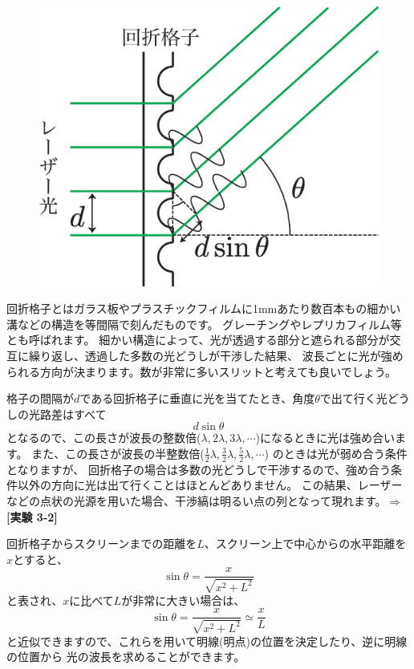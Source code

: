 \begin{figure}
\vspace*{-0.5cm}
\includegraphics[scale=0.5]{03_Interference/grating.eps}
\end{figure}


回折格子とはガラス板やプラスチックフィルムに1mmあたり数百本もの細かい溝などの構造を等間隔で刻んだものです。
グレーチングやレプリカフィルム等とも呼ばれます。
細かい構造によって、光が透過する部分と遮られる部分が交互に繰り返し、透過した多数の光どうしが干渉した結果、
波長ごとに光が強められる方向が決まります。数が非常に多いスリットと考えても良いでしょう。

格子の間隔が$d$である回折格子に垂直に光を当てたとき、角度$\theta$で出て行く光どうしの光路差はすべて
\[
d\sin\theta
\]
となるので、この長さが波長の整数倍($\lambda,2\lambda,3\lambda,\cdots$)になるときに光は強め合います。
また、この長さが波長の半整数倍($\frac{1}{2}\lambda,\frac{3}{2}\lambda,\frac{5}{2}\lambda,\cdots$)
のときは光が弱め合う条件となりますが、
回折格子の場合は多数の光どうしで干渉するので、強め合う条件以外の方向に光は出て行くことはほとんどありません。
この結果、レーザーなどの点状の光源を用いた場合、干渉縞は明るい点の列となって現れます。$\Rightarrow${\bf [実験 3-2]}

回折格子からスクリーンまでの距離を$L$、スクリーン上で中心からの水平距離を$x$とすると、
\[
\sin \theta = \frac{x}{\sqrt{x^2+L^2}}
\]
と表され、$x$に比べて$L$が非常に大きい場合は、
\[
\sin \theta = \frac{x}{\sqrt{x^2+L^2}} \simeq \frac{x}{L}
\]
と近似できますので、これらを用いて明線(明点)の位置を決定したり、逆に明線の位置から
光の波長を求めることができます。







